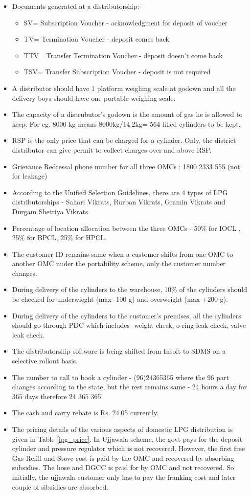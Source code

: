 \documentclass{report}
\begin{document}
\begin{itemize}
		\item Documents generated at a distributorship:-
		\begin{itemize}
			\item SV= Subscription Voucher - acknowledgment for deposit of voucher
			\item TV= Termination Voucher - deposit comes back
			\item TTV= Transfer Termination Voucher - deposit doesn't come back
			\item TSV= Transfer Subscription Voucher - deposit is not required
		\end{itemize}
		\item A distributor should have 1 platform weighing scale at godown and all the delivery boys should have one portable weighing scale.
		\item The capacity of a distrubutor's godown is the amount of gas he is allowed to keep. For eg. 8000 kg means 8000kg/14.2kg= 564 filled cylinders to be kept.
		\item RSP is the only price that can be charged for a cylinder. Only, the district distributor can give permit to collect charges over and above RSP.
		\item Grievance Redressal phone number for all three OMCs : 1800 2333 555 (not for leakage)
		\item According to the Unified Selection Guidelines, there are 4 types of LPG distributorships - Sahari Vikrats, Rurban Vikrats, Gramin Vikrats and Durgam Shetriya Vikrats
		\item Percentage of location allocation between the three OMCs - 50\% for IOCL , 25\% for BPCL, 25\% for HPCL.
		\item The customer ID remains same when a customer shifts from one OMC to another OMC under the portability scheme, only the customer number changes.
		\item During delivery of the cylinders to the warehouse, 10\% of the cylinders should be checked for underwieght (max -100 g) and overweight (max +200 g).
		\item During delivery of the cylinders to the customer's premises, all the cylinders should go through PDC which includes- weight check, o ring leak check, valve leak check.
		\item The distributorship software is being shifted from Insoft to SDMS on a selective rollout basis.
		\item The number to call to book a cylinder - (96)24365365 where the 96 part changes according to the state, but the rest remains same - 24 hours a day for 365 days therefore 24 365 365.
		\item The cash and carry rebate is Rs. 24.05 currently.
		\item The pricing details of the various aspects of domestic LPG distribution is given in Table \ref{lpg_price}. In Ujjawala scheme, the govt pays for the deposit - cylinder and pressure regulator which is not recovered. However, the first free Gas Refill and Stove cost is paid by the OMC and recovered by absorbing subsidies. The hose and DGCC is paid for by OMC and not recovered. So initially, the ujjawala customer only has to pay the franking cost and later couple of sibsidies are absorbed.
	\end{itemize}
\end{document}
